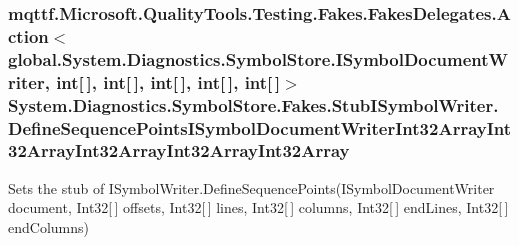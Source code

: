 \hypertarget{class_system_1_1_diagnostics_1_1_symbol_store_1_1_fakes_1_1_stub_i_symbol_writer_a4d289b8a96f7192f4cdd1ef686b3f124}{
\subsubsection[{Define\-Sequence\-Points\-I\-Symbol\-Document\-Writer\-Int32\-Array\-Int32\-Array\-Int32\-Array\-Int32\-Array\-Int32\-Array}]{\setlength{\rightskip}{0pt plus 5cm}mqttf.\-Microsoft.\-Quality\-Tools.\-Testing.\-Fakes.\-Fakes\-Delegates.\-Action$<$global.\-System.\-Diagnostics.\-Symbol\-Store.\-I\-Symbol\-Document\-Writer, int\mbox{[}$\,$\mbox{]}, int\mbox{[}$\,$\mbox{]}, int\mbox{[}$\,$\mbox{]}, int\mbox{[}$\,$\mbox{]}, int\mbox{[}$\,$\mbox{]}$>$ System.\-Diagnostics.\-Symbol\-Store.\-Fakes.\-Stub\-I\-Symbol\-Writer.\-Define\-Sequence\-Points\-I\-Symbol\-Document\-Writer\-Int32\-Array\-Int32\-Array\-Int32\-Array\-Int32\-Array\-Int32\-Array}}\label{class_system_1_1_diagnostics_1_1_symbol_store_1_1_fakes_1_1_stub_i_symbol_writer_a4d289b8a96f7192f4cdd1ef686b3f124}


Sets the stub of I\-Symbol\-Writer.\-Define\-Sequence\-Points(\-I\-Symbol\-Document\-Writer document, Int32\mbox{[}$\,$\mbox{]} offsets, Int32\mbox{[}$\,$\mbox{]} lines, Int32\mbox{[}$\,$\mbox{]} columns, Int32\mbox{[}$\,$\mbox{]} end\-Lines, Int32\mbox{[}$\,$\mbox{]} end\-Columns)

